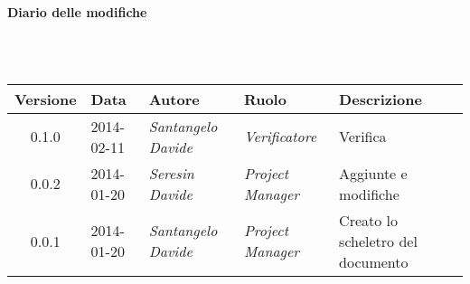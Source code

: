 \noindent\begin{Large}\textbf{Diario delle modifiche}\end{Large}\\
\\
\begin{small}
\begin{tabular}{|c|p{1.8cm}|p{2.8cm}|p{2.8cm}|p{3.5cm}|}
\hline
Versione & Data & Autore & Ruolo & Descrizione \\
\hline
\hline
0.1.0 & 2014-02-11 & 
\textit{Santangelo Davide} &
\textit{Verificatore} &  Verifica\\
\hline
0.0.2 & 2014-01-20 & 
\textit{Seresin Davide} &
\textit{Project Manager} &  Aggiunte e modifiche\\
\hline
0.0.1 & 2014-01-20 & 
\textit{Santangelo Davide} &
\textit{Project Manager} &  Creato lo scheletro del documento\\
\hline
\end{tabular}\\
\end{small}